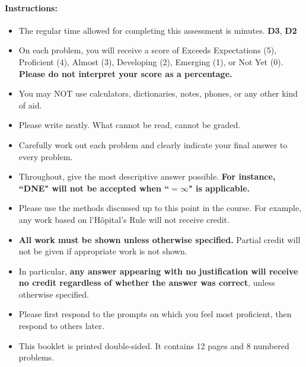 \documentclass[11pt]{article}
\begin{document}
{%

\paragraph*{Instructions:}

\begin{itemize}
    
    \item The regular time allowed for completing this assessment is  minutes.
    {\bf\color{ForestGreen}D3}, {\bf\color{ForestGreen}D2}
    \item On each problem, you will receive a score of Exceeds Expectations (5), Proficient (4), Almost (3), Developing (2), Emerging (1), or Not Yet (0). {\bf Please do not interpret your score as a percentage.}
    \item You may NOT use calculators, dictionaries, notes, phones, or any other kind of aid.
    \item Please write neatly. What cannot be read, cannot be graded.
    \item Carefully work out each problem and clearly indicate your final answer to every problem.
    \item Throughout, give the most descriptive answer possible. \textbf{For instance, ``DNE" will not be accepted when ``$=\infty$" is applicable.}
    \item Please use the methods discussed up to this point in the course. For example, any work based on l'H\^opital's Rule will not receive credit.
    \item \textbf{All work must be shown unless otherwise specified.} Partial credit will not be given if appropriate work is not shown.
    \item In particular, {\bf any answer appearing with no justification will receive no credit regardless of whether the answer was correct}, unless otherwise specified.
    \item Please first respond to the prompts on which you feel most proficient, then respond to others later.
    \item This booklet is printed double-sided. It contains 12 pages and 8 numbered problems.
    \end{itemize}
    
    }
\end{document}
